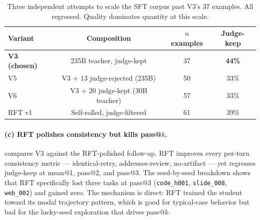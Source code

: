 \documentclass[11pt]{article}
\begin{document}
\begin{table}[ht]
\centering
\caption{Three independent attempts to scale the SFT corpus past V3's 37 examples. All regressed. Quality dominates quantity at this scale.}
\label{tab:distill-datascale}
\begin{tabular}{lccc}
\toprule
Variant & Composition & $n$ examples & Judge-keep \\
\midrule
\textbf{V3 (chosen)} & 235B teacher, judge-kept       & 37 & \textbf{44\%} \\
V5                   & V3 + 13 judge-rejected (235B)  & 50 & 33\% \\
V6                   & V3 + 20 judge-kept (30B teacher) & 57 & 33\% \\
RFT v1               & Self-rolled, judge-filtered    & 61 & 39\% \\
\bottomrule
\end{tabular}
\end{table}

\paragraph{(c) RFT polishes consistency but kills pass@$k$.}  compares V3 against the RFT-polished follow-up. RFT improves every per-turn consistency metric --- identical-retry, addresses-review, no-artifact --- yet regresses judge-keep at mean@1, pass@2, and pass@3. The seed-by-seed breakdown shows that RFT specifically lost three tasks at pass@3 (\texttt{code\_h001}, \texttt{slide\_008}, \texttt{web\_002}) and gained zero. The mechanism is direct: RFT trained the student toward its modal trajectory pattern, which is good for typical-case behavior but bad for the lucky-seed exploration that drives pass@$k$.
\end{document}
